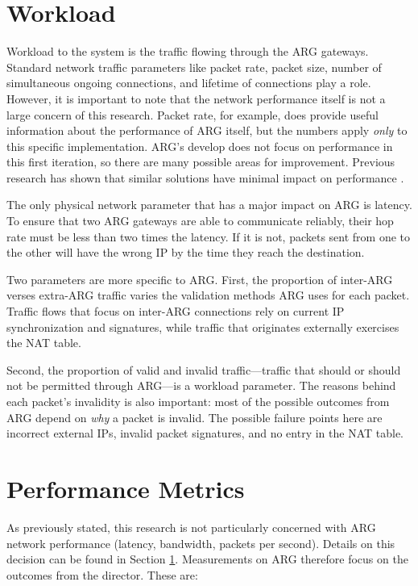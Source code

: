 \section{Workload}
\label{sec:workload}
\par Workload to the system is the traffic flowing through the \ac{ARG} gateways. Standard network traffic parameters like packet rate, packet size, number of simultaneous ongoing connections, and lifetime of connections play a role. However, it is important to note that the network performance itself is not a large concern of this research. Packet rate, for example, does provide useful information about the performance of \ac{ARG} itself, but the numbers apply \textit{only} to this specific implementation. \ac{ARG}'s develop does not focus on performance in this first iteration, so there are many possible areas for improvement. Previous research has shown that similar solutions have minimal impact on performance \cite{NAH}. 

\par The only physical network parameter that has a major impact on \ac{ARG} is latency. To ensure that two \ac{ARG} gateways are able to communicate reliably, their hop rate must be less than two times the latency. If it is not, packets sent from one to the other will have the wrong \ac{IP} by the time they reach the destination.  

\par Two parameters are more specific to \ac{ARG}. First, the proportion of inter-\ac{ARG} verses extra-\ac{ARG} traffic varies the validation methods \ac{ARG} uses for each packet. Traffic flows that focus on inter-\ac{ARG} connections rely on current \ac{IP} synchronization and signatures, while traffic that originates externally exercises the \ac{NAT} table.

\par Second, the proportion of valid and invalid traffic---traffic that should or should not be permitted through \ac{ARG}---is a workload parameter. The reasons behind each packet's invalidity is also important: most of the possible outcomes from \ac{ARG} depend on \textit{why} a packet is invalid. The possible failure points here are incorrect external \acp{IP}, invalid packet signatures, and no entry in the \ac{NAT} table.

\section{Performance Metrics}
\label{sec:metrics}
\par As previously stated, this research is not particularly concerned with \ac{ARG} network performance (latency, bandwidth, packets per second). Details on this decision can be found in Section \ref{sec:workload}. Measurements on \ac{ARG} therefore focus on the outcomes from the director. These are:

